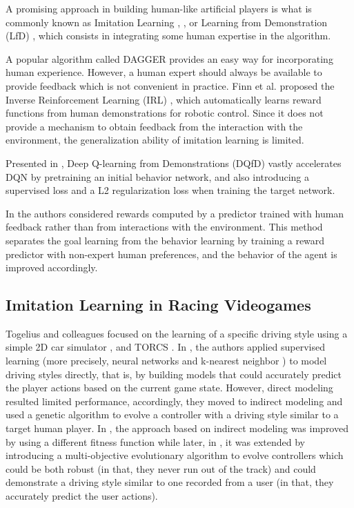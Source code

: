 A promising approach in building human-like artificial players is what is commonly known as Imitation Learning \cite{imit1}, \cite{imit2}, or Learning from Demonstration (LfD) \cite{lfd}, which consists in integrating some human expertise in the algorithm.


A popular algorithm called DAGGER \cite{dagger} provides an easy way for incorporating human experience. However, a human expert should always be available to provide feedback which is not convenient in practice. Finn et al. proposed the Inverse Reinforcement Learning (IRL) \cite{inverse}, which automatically learns reward functions from human demonstrations for robotic control. Since it does not provide a mechanism to obtain feedback from the interaction with the environment, the generalization ability of imitation learning is limited.

Presented in \cite{dqlfd}, Deep Q-learning from Demonstrations (DQfD) vastly accelerates DQN by pretraining an initial behavior network, and also introducing a supervised loss and a L2 regularization loss when training the target network.

In \cite{drlhp} the authors considered rewards computed by a predictor trained with human feedback rather than from  interactions with the environment. This method separates the goal learning from the behavior learning by training a reward predictor with non-expert human preferences, and the behavior of the agent is improved accordingly.

\subsection{Imitation Learning in Racing Videogames}

Togelius and colleagues focused on the learning of a specific driving style using a simple 2D car simulator \cite{imit3}, \cite{imit4} and TORCS \cite{imit5}. In \cite{imit3}, the authors applied supervised learning (more precisely, neural networks and k-nearest neighbor \cite{knn}) to model driving styles directly, that is, by building models that could accurately predict the player actions based on the current game state. However, direct modeling resulted limited performance, accordingly, they moved to indirect modeling and used a genetic algorithm to evolve a controller with a driving style similar to a target human player. In \cite{imit4}, the approach based on indirect modeling was improved by using a different fitness function while later, in \cite{imit5}, it was extended by introducing a multi-objective evolutionary algorithm to evolve controllers which could be both robust (in that, they never run out of the track) and could demonstrate a driving style similar to one recorded from a user (in that, they accurately predict the user actions).


